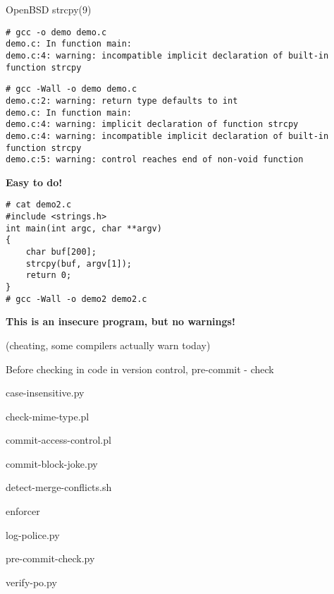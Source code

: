 \documentclass[Screen16to9,17pt]{foils}
\begin{document}
OpenBSD strcpy(9)




\begin{verbatim}
# gcc -o demo demo.c
demo.c: In function main:
demo.c:4: warning: incompatible implicit declaration of built-in
function strcpy
\end{verbatim}

\begin{verbatim}
# gcc -Wall -o demo demo.c
demo.c:2: warning: return type defaults to int
demo.c: In function main:
demo.c:4: warning: implicit declaration of function strcpy
demo.c:4: warning: incompatible implicit declaration of built-in
function strcpy
demo.c:5: warning: control reaches end of non-void function
\end{verbatim}

\vskip 15mm
\centerline{\bf\LARGE\color{security6blue}Easy to do!}


\begin{verbatim}
# cat demo2.c
#include <strings.h>
int main(int argc, char **argv)
{
    char buf[200];
    strcpy(buf, argv[1]);
    return 0;
}
# gcc -Wall -o demo2 demo2.c
\end{verbatim}

\vskip 1cm
\centerline{\bf\large\color{security6blue}This is an insecure program, but no warnings!}

(cheating, some compilers actually warn today)


\begin{list1}
\item Before checking in code in version control,  pre-commit - check
\begin{list2}
\item case-insensitive.py
\item check-mime-type.pl
\item commit-access-control.pl
\item commit-block-joke.py
\item detect-merge-conflicts.sh
\item enforcer
\item log-police.py
\item pre-commit-check.py
\item verify-po.py
\end{list2}
\item {}
\item {}
\end{list1}
\end{document}
